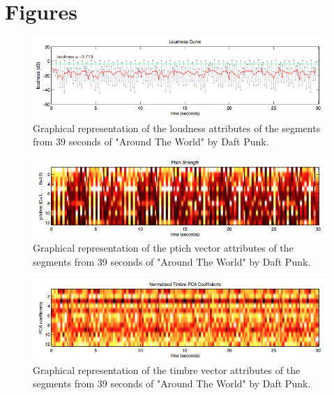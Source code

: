 \section{Figures} %
\label{sec:list_of_figures}

\begin{figure}[h]
    \centering
    \includegraphics[width=\textwidth]{figures/loudness.jpg}
    \caption{Graphical representation of the loudness attributes of the segments from 39 seconds of "Around The World" by Daft Punk.}
    \label{fig:loudness}
\end{figure}

\begin{figure}[h]
    \centering
    \includegraphics[width=\textwidth]{figures/pitch.jpg}
    \caption{Graphical representation of the ptich vector attributes of the segments from 39 seconds of "Around The World" by Daft Punk.}
    \label{fig:pitch}
\end{figure}

\begin{figure}[h]
    \centering
    \includegraphics[width=\textwidth]{figures/timbre.jpg}
    \caption{Graphical representation of the timbre vector attributes of the segments from 39 seconds of "Around The World" by Daft Punk.}
    \label{fig:timbre}
\end{figure}
